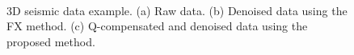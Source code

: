 \begin{figure}[htb!]
 \centering
 \\
  \caption{3D seismic data example. (a) Raw data. (b) Denoised data using the FX method. (c) Q-compensated and denoised data using the proposed method.}
  \label{fig:real3,real3-d2,real3-d1}
\end{figure}

